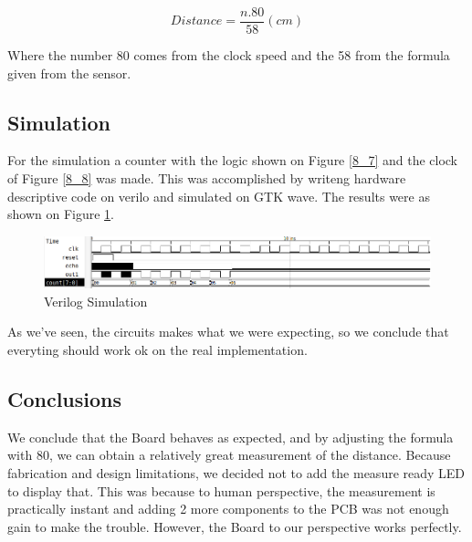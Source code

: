 \[
Distance=\frac{n.80}{58}(cm)
\]

Where the number 80 comes from the clock speed and the 58 from the
formula given from the sensor.

\subsection{\color{purple}Simulation}

For the simulation a counter with the logic shown on Figure \ref{8_7}
and the clock of Figure \ref{8_8} was made. This was accomplished
by writeng hardware descriptive code on verilo and simulated on GTK
wave. The results were as shown on Figure \ref{8_13}.

\begin{figure}[h!]
\begin{centering}
\includegraphics[scale=0.5]{../Exercise8/Informe/images/Count_simulation}
\par\end{centering}
\caption{\color{cyan}Verilog Simulation}
\label{8_13}

\end{figure}

As we've seen, the circuits makes what we were expecting, so we conclude
that everyting should work ok on the real implementation.

\subsection{\color{purple}Conclusions}

We conclude that the Board behaves as expected, and by adjusting the
formula with 80, we can obtain a relatively great measurement of the
distance. Because fabrication and design limitations, we decided not
to add the measure ready LED to display that. This was because to
human perspective, the measurement is practically instant and adding
2 more components to the PCB was not enough gain to make the trouble.
However, the Board to our perspective works perfectly.
